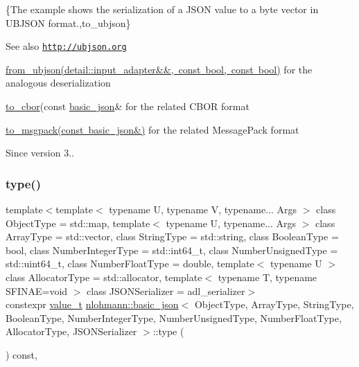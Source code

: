 \{The example shows the serialization of a J\+S\+ON value to a byte vector in U\+B\+J\+S\+ON format.,to\+\_\+ubjson\}

\begin{DoxySeeAlso}{See also}
\href{http://ubjson.org}{\tt http\+://ubjson.\+org} 

\mbox{\hyperlink{classnlohmann_1_1basic__json_a1ed52b463d2ef14c85ed076467168c72}{from\+\_\+ubjson(detail\+::input\+\_\+adapter\&\&, const bool, const bool)}} for the analogous deserialization 

\mbox{\hyperlink{classnlohmann_1_1basic__json_a2566783e190dec524bf3445b322873b8}{to\+\_\+cbor}}(const \mbox{\hyperlink{classnlohmann_1_1basic__json}{basic\+\_\+json}}\& for the related C\+B\+OR format 

\mbox{\hyperlink{classnlohmann_1_1basic__json_a09ca1dc273d226afe0ca83a9d7438d9c}{to\+\_\+msgpack(const basic\+\_\+json\&)}} for the related Message\+Pack format
\end{DoxySeeAlso}
\begin{DoxySince}{Since}
version 3.. 
\end{DoxySince}
\mbox{\label{classnlohmann_1_1basic__json_a2b2d781d7f2a4ee41bc0016e931cadf7}} 
\subsubsection{\texorpdfstring{type()}{type()}}
{\footnotesize\ttfamily template$<$template$<$ typename U, typename V, typename... Args $>$ class Object\+Type = std\+::map, template$<$ typename U, typename... Args $>$ class Array\+Type = std\+::vector, class String\+Type  = std\+::string, class Boolean\+Type  = bool, class Number\+Integer\+Type  = std\+::int64\+\_\+t, class Number\+Unsigned\+Type  = std\+::uint64\+\_\+t, class Number\+Float\+Type  = double, template$<$ typename U $>$ class Allocator\+Type = std\+::allocator, template$<$ typename T, typename S\+F\+I\+N\+A\+E=void $>$ class J\+S\+O\+N\+Serializer = adl\+\_\+serializer$>$ \\
constexpr \mbox{\hyperlink{namespacenlohmann_1_1detail_a1ed8fc6239da25abcaf681d30ace4985}{value\+\_\+t}} \mbox{\hyperlink{classnlohmann_1_1basic__json}{nlohmann\+::basic\+\_\+json}}$<$ Object\+Type, Array\+Type, String\+Type, Boolean\+Type, Number\+Integer\+Type, Number\+Unsigned\+Type, Number\+Float\+Type, Allocator\+Type, J\+S\+O\+N\+Serializer $>$\+::type (\begin{DoxyParamCaption}{ }\end{DoxyParamCaption}) const\hspace{0.3cm}{\ttfamily [inline]}, {\ttfamily [noexcept]}}




